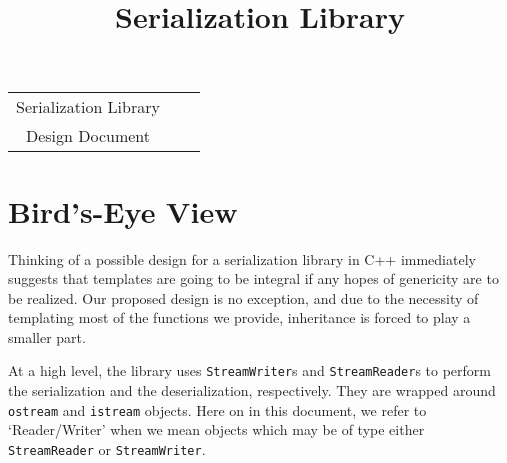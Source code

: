 \documentclass{article}
\begin{document}
\lstset{language=C++,captionpos=b,basicstyle=\small\sffamily,
  columns=fullflexible, xleftmargin=.25in, xrightmargin=.25in,
  resetmargins=true}
\newcommand{\choice}[1]{\textbf{Choice} #1}
\newcommand{\reason}[1]{\textbf{Reason} #1}
\newcommand{\term}[1]{\textbf{#1}}

\newcommand{\code}[1]{\lstinline!#1!}
\newcommand{\citem}[1]{\item{\code{#1}}}

\newcommand{\lclass}[1]
{
\noindent\makebox[\linewidth]{\rule{\textwidth}{1pt}} 

\textsc{Class} \code{#1}
}
\newcommand{\class}[1]
{
\textsc{Class} \code{#1}
}
\newcommand{\eoclass}
{
\noindent\makebox[\linewidth]{\rule{\textwidth}{1pt}}
}

\newcommand{\desc}[1]{\textbf{Description} #1}
\newcommand{\mems}[1]{\textbf{Data Members} \\ #1}


\newcommand{\cons}[1]{\textbf{Construction} \\ #1}
\newcommand{\oper}[1]{\textbf{Operators} \\ #1}
\newcommand{\memfns}[1]{\textbf{Member Functions} \\ #1}

\title{\textbf{Serialization Library}}
\maketitle
\begin{center}
\begin{tabular}{c c c}
Serialization Library \\
Design Document
\end{tabular}
\end{center}

\vspace{1.5cm}

\tableofcontents

\section{Bird's-Eye View}
Thinking of a possible design for a serialization library in C++
immediately suggests that templates are going to be integral if any
hopes of genericity are to be realized. Our proposed design is no
exception, and due to the necessity of templating most of the
functions we provide, inheritance is forced to play a smaller part.

At a high level, the library uses \code{StreamWriter}s and
\code{StreamReader}s to perform the serialization and the
deserialization, respectively. They are wrapped around \code{ostream}
and \code{istream} objects. Here on in this document, we refer to
`Reader/Writer' when we mean objects which may be of type either
\code{StreamReader} or \code{StreamWriter}.
\end{document}
